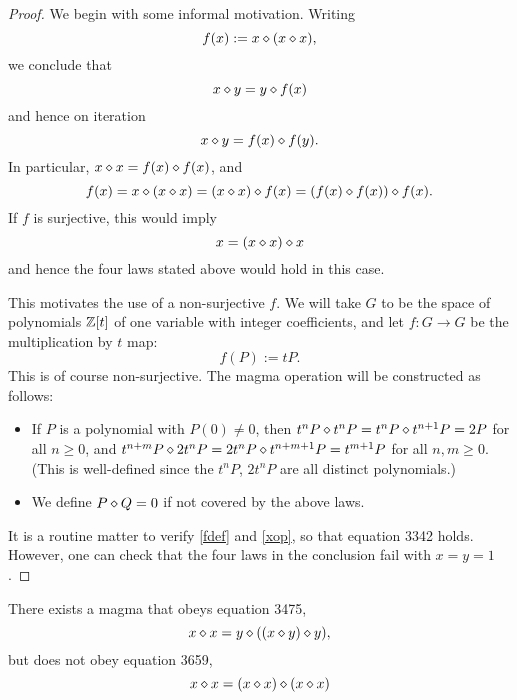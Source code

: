 \begin{proof}
We begin with some informal motivation. Writing
\begin{equation}\label{fdef}
  f(x) := x \diamond (x \diamond x),
\end{equation}
we conclude that
\begin{equation}\label{xop}
   x \diamond y = y \diamond f(x)
\end{equation}
and hence on iteration
$$ x \diamond y = f(x) \diamond f(y).$$
In particular, $x \diamond x = f(x) \diamond f(x)$, and
$$ f(x) = x \diamond (x \diamond x) = (x \diamond x) \diamond f(x) = (f(x) \diamond f(x)) \diamond f(x).$$
If $f$ is surjective, this would imply
$$ x = (x \diamond x) \diamond x$$
and hence the four laws stated above would hold in this case.

This motivates the use of a non-surjective $f$.  We will take $G$ to be the space of polynomials $\mathbb{Z}[t]$ of one variable with integer coefficients, and let $f: G \to G$ be the multiplication by $t$ map:
$$ f(P) := tP.$$
This is of course non-surjective. The magma operation will be constructed as follows:
\begin{itemize}
  \item If $P$ is a polynomial with $P(0) \neq 0$, then $t^n P \diamond t^n P = t^n P \diamond t^{n+1} P = 2P$ for all $n \geq 0$, and $t^{n+m} P \diamond 2t^n P = 2t^n P \diamond t^{n+m+1} P = t^{m+1} P$ for all $n, m \geq 0$.  (This is well-defined since the $t^n P$, $2t^n P$ are all distinct polynomials.)
  \item We define $P \diamond Q = 0$ if not covered by the above laws.
\end{itemize}

It is a routine matter to verify \eqref{fdef} and \eqref{xop}, so that equation 3342 holds.  However, one can check that the four laws in the conclusion fail with $x=y=1$.
\end{proof}

\begin{theorem}[3475 construction]\label{3475-construct}
There exists a magma that obeys equation 3475,
$$ x \diamond x = y \diamond ((x \diamond y) \diamond y),$$
but does not obey equation 3659,
$$x \diamond x = (x \diamond x) \diamond (x \diamond x)$$
\end{theorem}

